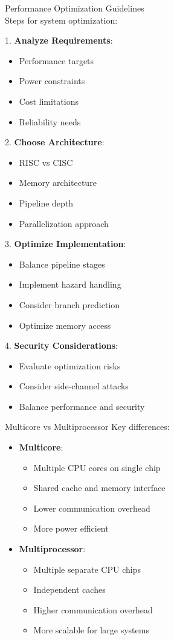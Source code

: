 \begin{KR}{Performance Optimization Guidelines}\\
Steps for system optimization:

1. \textbf{Analyze Requirements}:
\begin{itemize}
  \item Performance targets
  \item Power constraints
  \item Cost limitations
  \item Reliability needs
\end{itemize}

2. \textbf{Choose Architecture}:
\begin{itemize}
  \item RISC vs CISC
  \item Memory architecture
  \item Pipeline depth
  \item Parallelization approach
\end{itemize}

3. \textbf{Optimize Implementation}:
\begin{itemize}
  \item Balance pipeline stages
  \item Implement hazard handling
  \item Consider branch prediction
  \item Optimize memory access
\end{itemize}

4. \textbf{Security Considerations}:
\begin{itemize}
  \item Evaluate optimization risks
  \item Consider side-channel attacks
  \item Balance performance and security
\end{itemize}
\end{KR}

\begin{example2}{Multicore vs Multiprocessor}
Key differences:
\begin{itemize}
  \item \textbf{Multicore}:
    \begin{itemize}
      \item Multiple CPU cores on single chip
      \item Shared cache and memory interface
      \item Lower communication overhead
      \item More power efficient
    \end{itemize}
  \item \textbf{Multiprocessor}:
    \begin{itemize}
      \item Multiple separate CPU chips
      \item Independent caches
      \item Higher communication overhead
      \item More scalable for large systems
    \end{itemize}
\end{itemize}
\end{example2}

